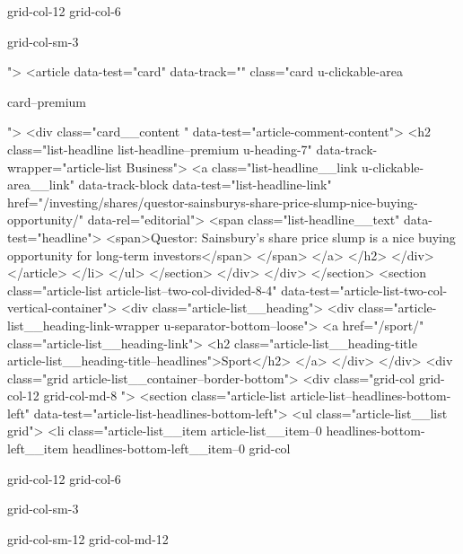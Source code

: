{{{			
			
			grid-col-12
			grid-col-6
			
			
			
			
			
			grid-col-sm-3
			
			
			
			
			
			
			
			
			">
<article data-test="card" data-track="" class="card
			u-clickable-area
			
			
			card--premium
			
			
			
			
			
			 ">
<div class="card__content " data-test="article-comment-content">
<h2 class="list-headline list-headline--premium u-heading-7" data-track-wrapper="article-list Business">
<a class="list-headline__link u-clickable-area__link" data-track-block data-test="list-headline-link" href="/investing/shares/questor-sainsburys-share-price-slump-nice-buying-opportunity/" data-rel="editorial">
<span class="list-headline__text" data-test="headline">
<span>Questor: Sainsbury’s share price slump is a nice buying opportunity for long-term investors</span>
</span>
</a>
</h2>
</div>
</article>
</li>
</ul>
</section>
</div>
</div>
</section>
<section class="article-list article-list--two-col-divided-8-4" data-test="article-list-two-col-vertical-container">
<div class="article-list__heading">
<div class="article-list__heading-link-wrapper
				u-separator-bottom--loose">
<a href="/sport/" class="article-list__heading-link">
<h2 class="article-list__heading-title article-list__heading-title--headlines">Sport</h2>
</a>
</div>
</div>
<div class="grid  article-list__container--border-bottom">
<div class="grid-col grid-col-12 grid-col-md-8 ">
<section class="article-list article-list--headlines-bottom-left" data-test="article-list-headlines-bottom-left">
<ul class="article-list__list grid">
<li class="article-list__item article-list__item--0 headlines-bottom-left__item headlines-bottom-left__item--0
			grid-col
			
			
			
			grid-col-12
			grid-col-6
			
			
			
			
			
			grid-col-sm-3
			
			
			
			
			
			
			grid-col-sm-12 grid-col-md-12
			
}}}
